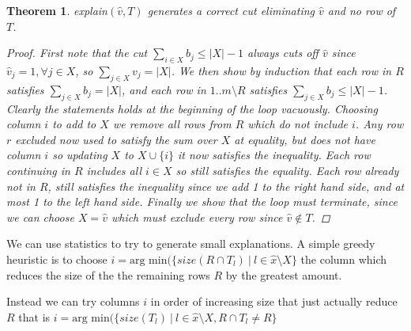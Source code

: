 \documentclass{article}
\newtheorem{theorem}{Theorem}
\begin{document}
\begin{theorem}
    \textsf{explain}$(\hat{v},T)$ generates a correct cut eliminating $\hat{v}$ and no row of $T$.
    \begin{proof}
        First note that the cut 
        $\sum_{i \in X} b_j \leq |X|-1$ always cuts off $\hat{v}$ since $\hat{v}_j = 1, \forall j \in X$, so $\sum_{j \in X} v_j = |X|$. 
        We then show by induction that each row
        in $R$ satisfies $\sum_{j \in X} b_j = |X|$, and each row in
        $1..m \setminus R$ satisfies
        $\sum_{j \in X} b_j \leq |X|-1$.
        Clearly the statements holds at the beginning of the loop vacuously.
        Choosing column $i$ to add to $X$ we remove all rows from $R$ which do not include $i$. Any row $r$ excluded now
        used to satisfy the sum over $X$ at equality, but does not have column $i$ so 
        updating $X$ to $X \cup \{i\}$ it now satisfies the inequality.
        Each row continuing in $R$ includes all $i \in X$ so still satisfies the equality. Each row already not in $R$, still satisfies the inequality since we add 1 to the right hand side, and at most 1 to the left hand side. 
        Finally we show that the loop must terminate, since we can choose $X = \hat{v}$ which must exclude every row
        since $\hat{v} \not\in T$. 
     \end{proof}
\end{theorem}


We can use statistics to try to generate small explanations.
A simple greedy heuristic is to choose
$i = \text{arg~min}(\{ size(R \cap T_l) ~|~ l \in \hat{x} \setminus X\}$
the column which reduces the size of the the remaining rows $R$ by the greatest amount.

Instead we can try columns $i$ in order of increasing size that just actually reduce $R$ that is
$i = \text{arg~min}(\{ size(T_l) ~|~ l \in \hat{x} \setminus X, R \cap T_l \neq R\}$ 
\end{document}
